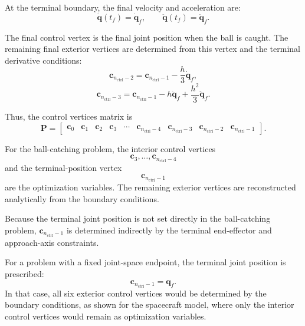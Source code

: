 At the terminal boundary, the final velocity and acceleration are:
\begin{equation}
    \dot{\mathbf{q}}(t_f)=\dot{\mathbf{q}}_f,
    \qquad
    \ddot{\mathbf{q}}(t_f)=\ddot{\mathbf{q}}_f.
\end{equation}

The final control vertex is the final joint position when the ball is caught. 
The remaining final exterior vertices are determined from this vertex and the terminal derivative conditions:
\begin{equation}
    \mathbf{c}_{n_{\mathrm{ctrl}}-2}
    =
    \mathbf{c}_{n_{\mathrm{ctrl}}-1}
    -
    \frac{h}{3}\dot{\mathbf{q}}_f,
\end{equation}
\begin{equation}
    \mathbf{c}_{n_{\mathrm{ctrl}}-3}
    =
    \mathbf{c}_{n_{\mathrm{ctrl}}-1}
    -
    h\dot{\mathbf{q}}_f
    +
    \frac{h^2}{3}\ddot{\mathbf{q}}_f.
\end{equation}

Thus, the control vertices matrix is
\begin{equation}
    \mathbf{P}
    =
    \begin{bmatrix}
        \mathbf{c}_0 &
        \mathbf{c}_1 &
        \mathbf{c}_2 &
        \mathbf{c}_3 &
        \cdots &
        \mathbf{c}_{n_{\mathrm{ctrl}}-4} &
        \mathbf{c}_{n_{\mathrm{ctrl}}-3} &
        \mathbf{c}_{n_{\mathrm{ctrl}}-2} &
        \mathbf{c}_{n_{\mathrm{ctrl}}-1}
    \end{bmatrix}.
\end{equation}

For the ball-catching problem, the interior control vertices $$\mathbf{c}_3,\ldots,\mathbf{c}_{n_{\mathrm{ctrl}}-4}$$
and the terminal-position vertex $$\mathbf{c}_{n_{\mathrm{ctrl}}-1}$$ are the optimization variables. 
The remaining exterior vertices are reconstructed analytically from the boundary conditions.

Because the terminal joint position is not set directly in the ball-catching problem, $\mathbf{c}_{n_{\mathrm{ctrl}}-1}$ is determined indirectly by the terminal end-effector and approach-axis constraints.

For a problem with a fixed joint-space endpoint, the terminal joint position is prescribed:
\begin{equation}
    \mathbf{c}_{n_{\mathrm{ctrl}}-1}
    =
    \mathbf{q}_f.
\end{equation}
In that case, all six exterior control vertices would be determined by the boundary conditions, as shown for the spacecraft model, where only the interior control vertices would remain as optimization variables.

